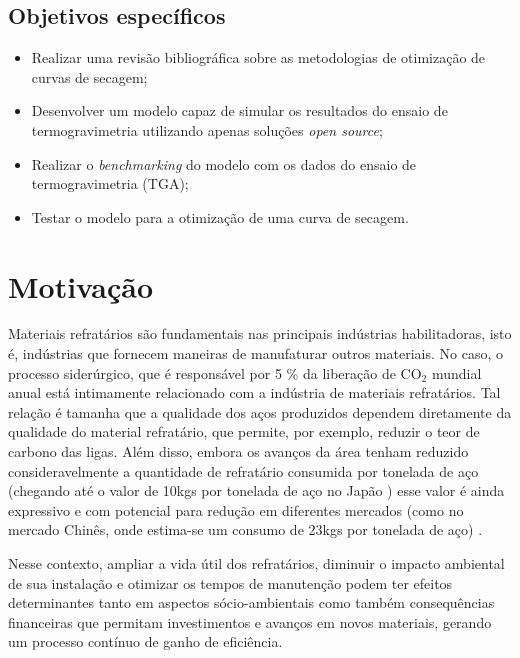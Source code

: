     \subsection{Objetivos específicos}
        
    \begin{itemize}
    \item Realizar uma revisão bibliográfica sobre as metodologias de otimização
      de curvas de secagem;
        
    \item Desenvolver um modelo capaz de simular os resultados do ensaio de
      termogravimetria utilizando apenas soluções \textit{open source};
        
    \item Realizar o \textit{benchmarking} do modelo com os dados do ensaio de
      termogravimetria (TGA);
        
    \item Testar o modelo para a otimização de uma curva de secagem.
    \end{itemize}
        
\section{Motivação}
Materiais refratários são fundamentais nas principais indústrias habilitadoras,
isto é, indústrias que fornecem maneiras de manufaturar outros materiais. No
caso, o processo siderúrgico, que é responsável por 5 \% \cite{Davis2018} da
liberação de CO$_2$ mundial anual está intimamente relacionado com a indústria
de materiais refratários. Tal relação é tamanha que a qualidade dos aços
produzidos dependem diretamente da qualidade do material refratário, que
permite, por exemplo, reduzir o teor de carbono das ligas. Além disso, embora os
avanços da área tenham reduzido consideravelmente a quantidade de refratário
consumida por tonelada de aço (chegando até o valor de 10kgs por tonelada de aço
no Japão \cite{Report2003}) esse valor é ainda expressivo e com potencial para redução em
diferentes mercados (como no mercado Chinês, onde estima-se um consumo de 23kgs
por tonelada de aço) \cite{refperton}.

   Nesse contexto, ampliar a vida útil dos refratários, diminuir o impacto
   ambiental de sua instalação e otimizar os tempos de manutenção podem ter
   efeitos determinantes tanto em aspectos sócio-ambientais como também
   consequências financeiras que permitam investimentos e avanços em novos
   materiais, gerando um processo contínuo de ganho de eficiência.

